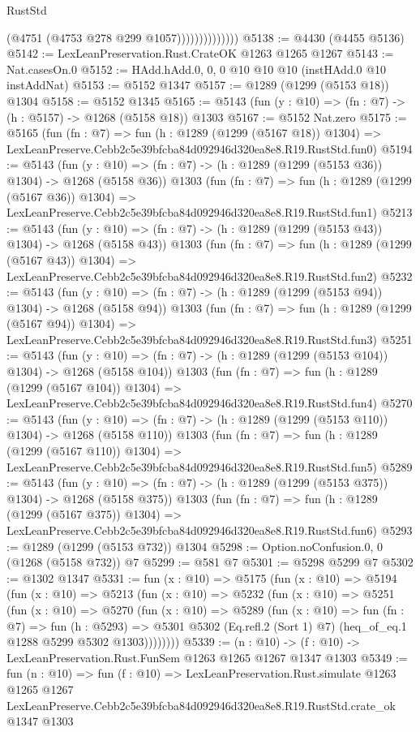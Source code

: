 \begin{lexlean}{RustStd}
\begin{coremodule}
                            (@4751 (@4753 @278 @299 @1057))))))))))))))
@5138 := @4430 (@4455 @5136)
@5142 := LexLeanPreservation.Rust.CrateOK @1263 @1265 @1267
@5143 := Nat.casesOn.{0}
@5152 := HAdd.hAdd.{0, 0, 0} @10 @10 @10 (instHAdd.{0} @10 instAddNat)
@5153 := @5152 @1347
@5157 := @1289 (@1299 (@5153 @18)) @1304
@5158 := @5152 @1345
@5165 := @5143 (fun (y : @10) => (fn : @7) -> (h : @5157) -> @1268 (@5158 @18)) @1303
@5167 := @5152 Nat.zero
@5175 := @5165
    (fun (fn : @7) =>
    fun (h : @1289 (@1299 (@5167 @18)) @1304) =>
    LexLeanPreserve.Cebb2c5e39bfcba84d092946d320ea8e8.R19.RustStd.fun0)
@5194 := @5143
    (fun (y : @10) => (fn : @7) -> (h : @1289 (@1299 (@5153 @36)) @1304) -> @1268 (@5158 @36))
    @1303
    (fun (fn : @7) =>
    fun (h : @1289 (@1299 (@5167 @36)) @1304) =>
    LexLeanPreserve.Cebb2c5e39bfcba84d092946d320ea8e8.R19.RustStd.fun1)
@5213 := @5143
    (fun (y : @10) => (fn : @7) -> (h : @1289 (@1299 (@5153 @43)) @1304) -> @1268 (@5158 @43))
    @1303
    (fun (fn : @7) =>
    fun (h : @1289 (@1299 (@5167 @43)) @1304) =>
    LexLeanPreserve.Cebb2c5e39bfcba84d092946d320ea8e8.R19.RustStd.fun2)
@5232 := @5143
    (fun (y : @10) => (fn : @7) -> (h : @1289 (@1299 (@5153 @94)) @1304) -> @1268 (@5158 @94))
    @1303
    (fun (fn : @7) =>
    fun (h : @1289 (@1299 (@5167 @94)) @1304) =>
    LexLeanPreserve.Cebb2c5e39bfcba84d092946d320ea8e8.R19.RustStd.fun3)
@5251 := @5143
    (fun (y : @10) => (fn : @7) -> (h : @1289 (@1299 (@5153 @104)) @1304) -> @1268 (@5158 @104))
    @1303
    (fun (fn : @7) =>
    fun (h : @1289 (@1299 (@5167 @104)) @1304) =>
    LexLeanPreserve.Cebb2c5e39bfcba84d092946d320ea8e8.R19.RustStd.fun4)
@5270 := @5143
    (fun (y : @10) => (fn : @7) -> (h : @1289 (@1299 (@5153 @110)) @1304) -> @1268 (@5158 @110))
    @1303
    (fun (fn : @7) =>
    fun (h : @1289 (@1299 (@5167 @110)) @1304) =>
    LexLeanPreserve.Cebb2c5e39bfcba84d092946d320ea8e8.R19.RustStd.fun5)
@5289 := @5143
    (fun (y : @10) => (fn : @7) -> (h : @1289 (@1299 (@5153 @375)) @1304) -> @1268 (@5158 @375))
    @1303
    (fun (fn : @7) =>
    fun (h : @1289 (@1299 (@5167 @375)) @1304) =>
    LexLeanPreserve.Cebb2c5e39bfcba84d092946d320ea8e8.R19.RustStd.fun6)
@5293 := @1289 (@1299 (@5153 @732)) @1304
@5298 := Option.noConfusion.{0, 0} (@1268 (@5158 @732)) @7
@5299 := @581 @7
@5301 := @5298 @5299 @7
@5302 := @1302 @1347
@5331 := fun (x : @10) =>
  @5175
    (fun (x : @10) =>
    @5194
      (fun (x : @10) =>
      @5213
        (fun (x : @10) =>
        @5232
          (fun (x : @10) =>
          @5251
            (fun (x : @10) =>
            @5270
              (fun (x : @10) =>
              @5289
                (fun (x : @10) =>
                fun (fn : @7) =>
                fun (h : @5293) =>
                @5301 @5302 (Eq.refl.{2} (Sort 1) @7) (heq_of_eq.{1} @1288 @5299 @5302 @1303))))))))
@5339 := (n : @10) -> (f : @10) -> LexLeanPreservation.Rust.FunSem @1263 @1265 @1267 @1347 @1303
@5349 := fun (n : @10) =>
  fun (f : @10) =>
  LexLeanPreservation.Rust.simulate
    @1263
    @1265
    @1267
    LexLeanPreserve.Cebb2c5e39bfcba84d092946d320ea8e8.R19.RustStd.crate_ok
    @1347
    @1303
\end{coremodule}
\end{lexlean}
